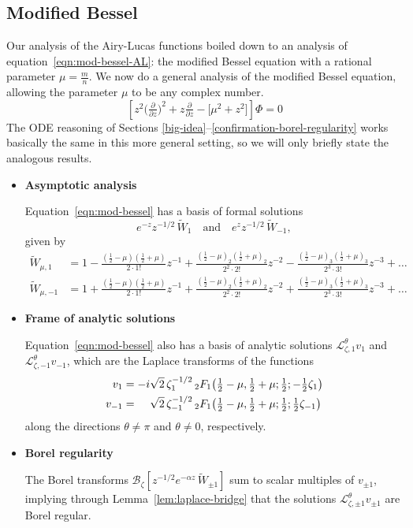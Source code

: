 \documentclass{article}
\newcommand{\series}[1]{\tilde{#1}}
\newcommand{\laplace}{\mathcal{L}}
\theoremstyle{definition}
\theoremstyle{plain}
\begin{document}
\subsection{Modified Bessel}\label{sec:mod-bessel-lift}
Our analysis of the Airy-Lucas functions boiled down to an analysis of equation~\eqref{eqn:mod-bessel-AL}: the modified Bessel equation with a rational parameter $\mu = \tfrac{m}{n}$. We now do a general analysis of the modified Bessel equation, allowing the parameter $\mu$ to be any complex number.
\begin{equation}\label{eqn:mod-bessel}
\left[z^2 \big(\tfrac{\partial}{\partial z}\big)^2 + z \tfrac{\partial}{\partial z} - \big[\mu^2 + z^2\big]\right] \Phi = 0
\end{equation}
The ODE reasoning of Sections \ref{big-idea}\;--\;\ref{confirmation-borel-regularity} works basically the same in this more general setting, so we will only briefly state the analogous results.
\begin{itemize}
\item[] \textbf{Asymptotic analysis}

Equation~\eqref{eqn:mod-bessel} has a basis of formal solutions \[ e^{-z} z^{-1/2}\,\series{W}_1 \quad \text{and} \quad e^z z^{-1/2}\,\series{W}_{-1}, \]
given by
\begin{align*}
\series{W}_{\mu,1} & = 1 - \frac{\left(\tfrac{1}{2}-\mu\right)\left(\frac{1}{2}+\mu\right)}{2 \cdot 1!} z^{-1} + \frac{\left(\tfrac{1}{2}-\mu\right)_2\left(\frac{1}{2}+\mu\right)_2}{2^2 \cdot 2!} z^{-2} - \frac{\left(\tfrac{1}{2}-\mu\right)_3\left(\frac{1}{2}+\mu\right)_3}{2^3 \cdot 3!} z^{-3} + \ldots \\
\series{W}_{\mu,-1} & = 1 + \frac{\left(\tfrac{1}{2}-\mu\right)\left(\frac{1}{2}+\mu\right)}{2 \cdot 1!} z^{-1} + \frac{\left(\tfrac{1}{2}-\mu\right)_2\left(\frac{1}{2}+\mu\right)_2}{2^2 \cdot 2!} z^{-2}+ \frac{\left(\tfrac{1}{2}-\mu\right)_3\left(\frac{1}{2}+\mu\right)_3}{2^3 \cdot 3!} z^{-3} + \ldots
\end{align*}   
\item[]  \textbf{Frame of analytic solutions}

Equation~\eqref{eqn:mod-bessel} also has a basis of analytic solutions $\laplace^\theta_{\zeta, 1} v_1$ and $\laplace^\theta_{\zeta, -1} v_{-1}$, which are the Laplace transforms of the functions
\begin{align*}
v_1 & = -i\sqrt{2}\,\zeta_{1}^{-1/2}\,{}_2F_1\big(\tfrac{1}{2}-\mu, \tfrac{1}{2}+\mu; \tfrac{1}{2}; -\tfrac{1}{2}\zeta_{1}\big)\\
v_{-1} & = \hphantom{-i}\sqrt{2}\,\zeta_{-1}^{-1/2}\,{}_2F_1\big(\tfrac{1}{2}-\mu, \tfrac{1}{2}+\mu; \tfrac{1}{2}; \tfrac{1}{2}\zeta_{-1}\big)
\end{align*}
along the directions $\theta \neq \pi$ and $\theta \neq 0$, respectively.
\item[] \textbf{Borel regularity}

The Borel transforms $\mathcal{B}_\zeta[z^{-1/2} e^{-\alpha z}\,\series{W}_{\pm 1}]$ sum to scalar multiples of $v_{\pm 1}$, implying through Lemma~\ref{lem:laplace-bridge} that the solutions $\laplace^\theta_{\zeta, \pm 1} v_{\pm 1}$ are Borel regular.
\end{itemize}
\end{document}
